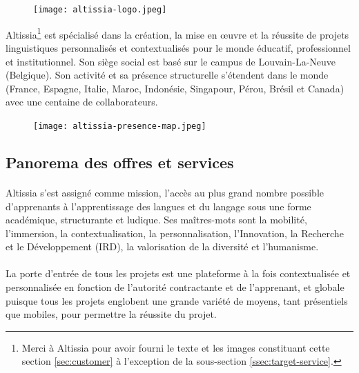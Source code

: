 \begin{figure}
    \centering
    \texttt{[image: altissia-logo.jpeg]}
\end{figure}

Altissia\footnote{Merci à Altissia pour avoir fourni le texte et les images constituant cette section \ref{sec:customer} à l'exception de la sous-section \ref{ssec:target-service}.} est spécialisé dans la création, la mise en œuvre et la réussite de projets linguistiques personnalisés et contextualisés pour le monde éducatif, professionnel et institutionnel.  
Son siège social est basé sur le campus de Louvain-La-Neuve (Belgique).
Son activité et sa présence structurelle s’étendent dans le monde (France, Espagne, Italie, Maroc, Indonésie, Singapour, Pérou, Brésil et Canada) avec une centaine de collaborateurs.
\begin{figure}
    \centering
    \texttt{[image: altissia-presence-map.jpeg]}
\end{figure}

\subsection{Panorema des offres et services}
\paragraph{}
Altissia s’est assigné comme mission, l’accès au plus grand nombre possible d’apprenants à l’apprentissage des langues et du langage sous une forme académique, structurante et ludique. Ses maîtres-mots sont la mobilité, l’immersion, la contextualisation, la personnalisation, l’Innovation, la Recherche et le Développement (IRD), la valorisation de la diversité et l’humanisme.

\paragraph{}
La porte d’entrée de tous les projets est une plateforme à la fois contextualisée et personnalisée en fonction de l’autorité contractante et de l’apprenant,
et globale puisque tous les projets englobent une grande variété de moyens,
tant présentiels que mobiles, pour permettre la réussite du projet.

